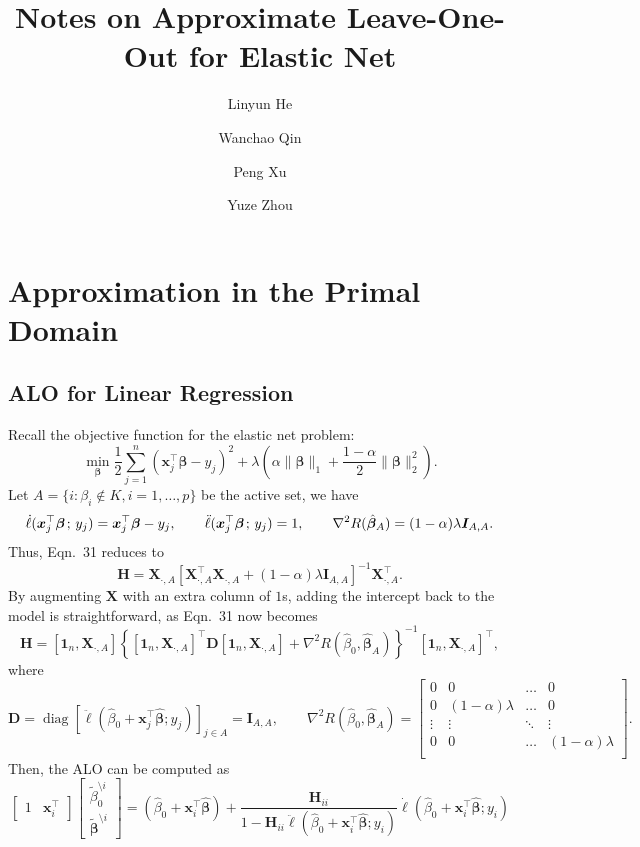 \documentclass[11pt]{article}
\title{Notes on Approximate Leave-One-Out for Elastic Net}
\author{Linyun He \and Wanchao Qin \and Peng Xu \and Yuze Zhou}
\newcommand{\bx}{\bm{x}}
\newcommand{\bH}{\bm{H}}
\newcommand{\bI}{\bm{I}}
\newcommand{\bX}{\bm{X}}
\newcommand{\bbeta}{\bm{\beta}}
\newcommand{\bOne}{\bm{1}}
\newcommand{\semicol}{\nobreak\mskip2mu\mathpunct{}\nonscript\mkern-\thinmuskip{;}\mskip6muplus1mu\relax}
\DeclareMathOperator{\diag}{diag}
\newcommand{\refthm}[2]{#1~#2}
\begin{document}
\maketitle

\section{Approximation in the Primal Domain}
\subsection{ALO for Linear Regression}
Recall the objective function for the elastic net problem:
	\begin{equation}
	\min_{\bbeta}\frac{1}{2}\sum_{j=1}^{n}(\bx_j^\top\bbeta-y_j)^2+\lambda\left(\alpha\|\bbeta\|_1+\frac{1-\alpha}{2}\|\bbeta\|_2^2\right).
	\end{equation}
Let \(A=\{i:\beta_i\not\in K,i=1,\dotsc,p\}\) be the active set, we have \[\dot{\ell}(\bx_j^\top\bbeta\semicol y_j)=\bx_j^\top\bbeta-y_j,\qquad\ddot{\ell}(\bx_j^\top\bbeta\semicol y_j)=1,\qquad\nabla^2 R(\hat{\bbeta}_A)=(1-\alpha)\lambda\bI_{A,A}.\] Thus, \refthm{Eqn.}{31} reduces to
	\begin{equation}
	\bH=\bX_{\cdot,A}\left[\bX_{\cdot,A}^\top\bX_{\cdot,A}+\left(1-\alpha\right)\lambda\bI_{A,A}\right]^{-1}\bX_{\cdot,A}^\top.
	\end{equation}
By augmenting \(\bX\) with an extra column of \(1\)s, adding the intercept back to the model is straightforward, as \refthm{Eqn.}{31} now becomes 
	\begin{equation}
	\bm{H}=\left[\bOne_n,\bm{X}_{\cdot, A}\right]\left\{\left[\bOne_n,\bm{X}_{\cdot, A}\right]^\top\bm{D}\left[\bOne_n,\bm{X}_{\cdot, A}\right]+\nabla^2R\left(\hat{\beta}_0,\hat{\bm{\beta}}_A\right)\right\}^{-1}\left[\bOne_n,\bm{X}_{\cdot, A}\right]^\top,
	\end{equation}
where \[\bm{D}=\diag\left[\ddot{\ell}\left(\hat{\beta}_0+\bm{x}_j^\top\hat{\bm{\beta}};y_j\right)\right]_{j\in A}=\bI_{A,A},\qquad\nabla^2R\left(\hat{\beta}_0,\hat{\bm{\beta}}_A\right)=\begin{bmatrix}
0 & 0 & \dots & 0 \\
0 & (1-\alpha)\lambda & \dots & 0\\
\vdots & \vdots & \ddots & \vdots\\
0 & 0 & \dots & (1-\alpha)\lambda \\
\end{bmatrix}.\] Then, the ALO can be computed as
	\begin{equation}
	\begin{bmatrix}
	1 & \bm{x}_i^\top\end{bmatrix}
	\begin{bmatrix}
	\tilde{\beta}_0^{\setminus i} \\
	\tilde{\bm{\beta}}^{\setminus i}\end{bmatrix}=(\hat{\beta}_0+\bm{x}_i^\top\hat{\bm{\beta}})+\frac{\bH_{ii}}{1-\bH_{ii}\ddot{\ell}\left(\hat{\beta}_0+\bm{x}_i^\top\hat{\bm{\beta}};y_i\right)}\dot{\ell}\left(\hat{\beta}_0+\bm{x}_i^\top\hat{\bm{\beta}};y_i\right)
	\end{equation}
	
\end{document}
